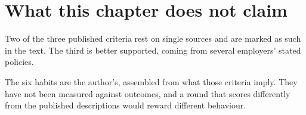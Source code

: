 \section*{What this chapter does not claim}

Two of the three published criteria rest on single sources and are marked as
such in the text. The third is better supported, coming from several employers'
stated policies.

The six habits are the author's, assembled from what those criteria imply. They
have not been measured against outcomes, and a round that scores differently
from the published descriptions would reward different behaviour.
